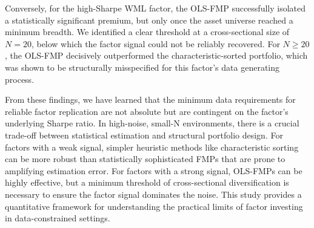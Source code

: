 \documentclass[]{article}
\begin{document}
Conversely, for the high-Sharpe WML factor, the OLS-FMP successfully isolated a statistically significant premium, but only once the asset universe reached a minimum breadth. We identified a clear threshold at a cross-sectional size of $N=20$, below which the factor signal could not be reliably recovered. For $N \ge 20$, the OLS-FMP decisively outperformed the characteristic-sorted portfolio, which was shown to be structurally misspecified for this factor's data generating process.

From these findings, we have learned that the minimum data requirements for reliable factor replication are not absolute but are contingent on the factor's underlying Sharpe ratio. In high-noise, small-N environments, there is a crucial trade-off between statistical estimation and structural portfolio design. For factors with a weak signal, simpler heuristic methods like characteristic sorting can be more robust than statistically sophisticated FMPs that are prone to amplifying estimation error. For factors with a strong signal, OLS-FMPs can be highly effective, but a minimum threshold of cross-sectional diversification is necessary to ensure the factor signal dominates the noise. This study provides a quantitative framework for understanding the practical limits of factor investing in data-constrained settings.


{}

\end{document}
